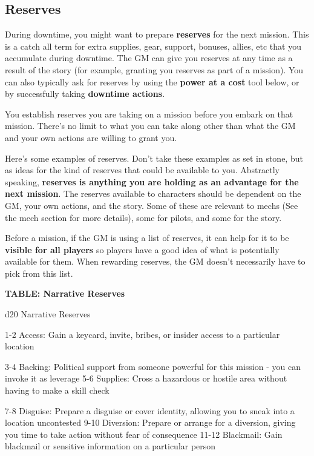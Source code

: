 \subsection{Reserves}

During downtime, you might want to prepare \textbf{reserves} for the next mission. This is a catch all term for extra supplies, gear, support, bonuses, allies, etc that you accumulate during downtime. The GM can give you reserves at any time as a result of the story (for example, granting you reserves as part of a mission). You can also typically ask for reserves by using the\textbf{ power at a cost} tool below, or by successfully taking \textbf{downtime actions}.

You establish reserves you are taking on a mission before you embark on that mission. There’s no limit to what you can take along other than what the GM and your own actions are willing to grant you.

Here’s some examples of reserves. Don’t take these examples as set in stone, but as ideas for the kind of reserves that could be available to you. Abstractly speaking, \textbf{reserves is anything you are holding as an advantage for the next mission}. The reserves available to characters should be dependent on the GM, your own actions, and the story. Some of these are relevant to mechs (See the mech section for more details), some for pilots, and some for the story.

Before a mission, if the GM is using a list of reserves, it can help for it to be \textbf{visible for all players} so players have a good idea of what is potentially available for them. When rewarding reserves, the GM doesn’t necessarily have to pick from this list.

\textbf{TABLE: Narrative Reserves}

 d20       Narrative	Reserves

  1-2      Access: Gain a keycard, invite, bribes, or insider access to a particular location

  3-4      Backing: Political support from someone powerful for this mission - you can invoke it
           as leverage
  5-6      Supplies: Cross a hazardous or hostile area without having to make a skill check

  7-8      Disguise: Prepare a disguise or cover identity, allowing you to sneak into a location
           uncontested
 9-10      Diversion: Prepare or arrange for a diversion, giving you time to take action without
           fear of consequence
   11-12   Blackmail: Gain blackmail or sensitive information on a particular person

